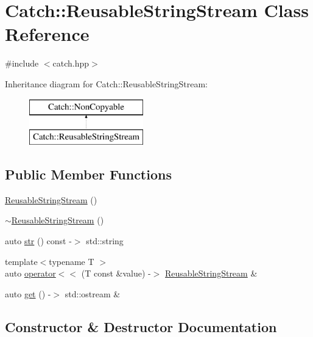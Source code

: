 \hypertarget{class_catch_1_1_reusable_string_stream}{}\section{Catch\+:\+:Reusable\+String\+Stream Class Reference}
\label{class_catch_1_1_reusable_string_stream}


{\ttfamily \#include $<$catch.\+hpp$>$}

Inheritance diagram for Catch\+:\+:Reusable\+String\+Stream\+:\begin{figure}[H]
\begin{center}
\leavevmode
\includegraphics[height=2.000000cm]{class_catch_1_1_reusable_string_stream}
\end{center}
\end{figure}
\subsection*{Public Member Functions}
\begin{DoxyCompactItemize}
\item 
\mbox{\hyperlink{class_catch_1_1_reusable_string_stream_a9b3f8c52b0d2d63ffd825297a9c09781}{Reusable\+String\+Stream}} ()
\item 
\mbox{\hyperlink{class_catch_1_1_reusable_string_stream_aba9384e258a4db3178447b6a58414712}{$\sim$\+Reusable\+String\+Stream}} ()
\item 
auto \mbox{\hyperlink{class_catch_1_1_reusable_string_stream_a0e9ecf260b2a5d35f4886ef0d51f6270}{str}} () const -\/$>$ std\+::string
\item 
{\footnotesize template$<$typename T $>$ }\\auto \mbox{\hyperlink{class_catch_1_1_reusable_string_stream_af95f72024c082db70e5e50782e28e4f6}{operator$<$$<$}} (T const \&value) -\/$>$ \mbox{\hyperlink{class_catch_1_1_reusable_string_stream}{Reusable\+String\+Stream}} \&
\item 
auto \mbox{\hyperlink{class_catch_1_1_reusable_string_stream_a6881808c60a080d4e24a0b81c94cbf67}{get}} () -\/$>$ std\+::ostream \&
\end{DoxyCompactItemize}


\subsection{Constructor \& Destructor Documentation}
\mbox{\label{class_catch_1_1_reusable_string_stream_a9b3f8c52b0d2d63ffd825297a9c09781}} 
